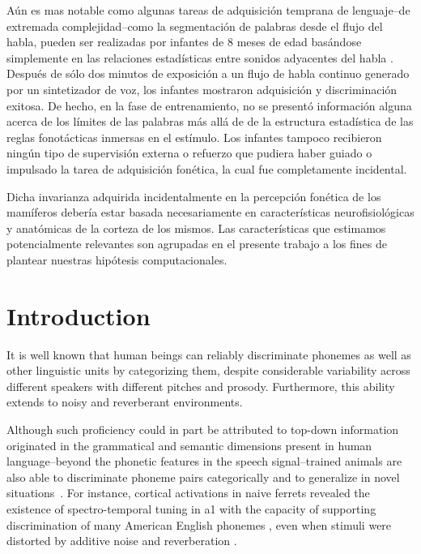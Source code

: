 {Aún es mas notable como algunas tareas de adquisición temprana de lenguaje--de extremada complejidad--como la segmentación de palabras desde el flujo del habla, pueden ser realizadas por infantes de 8 meses de edad basándose simplemente en las relaciones estadísticas entre sonidos adyacentes del habla \cite{Saffran1996StatisticalLB}.
Después de sólo dos minutos de exposición a un flujo de habla continuo generado por un sintetizador de voz, los infantes mostraron adquisición y discriminación exitosa. De hecho, en la fase de entrenamiento, no se presentó información alguna acerca de los límites de las palabras más allá de de la estructura estadística de las reglas fonotácticas inmersas en el estímulo. Los infantes tampoco recibieron ningún tipo de supervisión externa o refuerzo que pudiera haber guiado o impulsado la tarea de adquisición fonética, la cual fue completamente incidental.

Dicha invarianza adquirida incidentalmente en la percepción fonética de los mamíferos debería estar basada necesariamente en características neurofisiológicas y anatómicas de la corteza de los mismos. Las características que estimamos potencialmente relevantes son agrupadas en el presente trabajo a los fines de plantear nuestras hipótesis computacionales.
}{
\section{Introduction}

It is well known that human beings can reliably discriminate phonemes as well as other linguistic units by categorizing them, despite considerable variability across different speakers with different pitches and prosody. Furthermore, this ability extends to noisy and reverberant environments.

Although such proficiency could in part be attributed to top-down information \cite{PMID:17451657} originated in the grammatical and semantic \cite{OBLESER2011713,10.1093/cercor/bhp128} dimensions present in human language--beyond the phonetic features in the speech signal--trained animals are also able to discriminate phoneme pairs categorically and to generalize in novel situations~\cite{kuhl_1975, kuhl_1983, kluender_1998, pons_2006, hienz_1996, dent_1997, lotto_1997}. For instance, cortical activations in naive ferrets revealed the existence of spectro-temporal tuning in \gls{a1} with the capacity of supporting discrimination of many American English phonemes \cite{mesgarani_2008}, even when stimuli were distorted by additive noise and reverberation \cite{mesgarani_2014A}.

}

